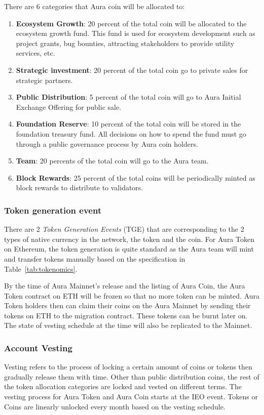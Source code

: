 \documentclass[12pt, titlepage]{article}
\begin{document}
There are 6 categories that Aura coin will be allocated to:
\begin{enumerate}
    \item \textbf{Ecosystem Growth}: 20 percent of the total coin will be allocated to the ecosystem growth fund. This fund is used for ecosystem development such as project grants, bug bounties, attracting stakeholders to provide utility services, etc. 
    \item \textbf{Strategic investment}: 20 percent of the total coin go to private sales for strategic partners.
    \item \textbf{Public Distribution}: 5 percent of the total coin will go to Aura Initial Exchange Offering for public sale.
    \item \textbf{Foundation Reserve}: 10 percent of the total coin will be stored in the foundation treasury fund. All decisions on how to spend the fund must go through a public governance process by Aura coin holders. 
    \item \textbf{Team}: 20 percents of the total coin will go to the Aura team.
    \item \textbf{Block Rewards}: 25 percent of the total coins will be periodically minted as block rewards to distribute to validators.
\end{enumerate}

\subsubsection{Token generation event}
There are 2 \emph{Token Generation Events} (TGE) that are corresponding to the 2 types of native currency in the network, the token and the coin. For Aura Token on Ethereum, the token generation is quite standard as the Aura team will mint and transfer tokens manually based on the specification in Table~\ref{tab:tokenomics}.

By the time of Aura Mainnet's release and the listing of Aura Coin, the Aura Token contract on ETH will be frozen so that no more token can be minted. Aura Token holders then can claim their coins on the Aura Mainnet by sending their tokens on ETH to the migration contract. These tokens can be burnt later on. The state of vesting schedule at the time will also be replicated to the Mainnet. 

\subsubsection{Account Vesting}
Vesting refers to the process of locking a certain amount of coins or tokens then gradually release them with time. Other than public distribution coins, the rest of the token allocation categories are locked and vested on different terms. The vesting process for Aura Token and Aura Coin starts at the IEO event. Tokens or Coins are linearly unlocked every month based on the vesting schedule. 
\end{document}
